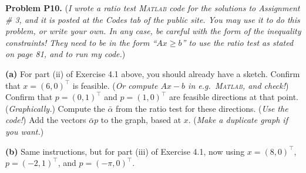 \documentclass[12pt]{amsart}
\newcommand{\Matlab}{\textsc{Matlab}\xspace}
\newcommand{\prob}[1]{\bigskip\noindent\textbf{#1}\quad }
\newcommand{\epart}[1]{\medskip\noindent\textbf{(#1)}\quad }
\begin{document}
\prob{Problem P10.}  (\emph{I wrote a ratio test \Matlab code for the solutions to Assignment \# 3, and it is posted at the Codes tab of the public site.  You may use it to do this problem, or write your own.  In any case, be careful with the form of the inequality constraints!  They need to be in the form ``$Ax\ge b$'' to use the ratio test as stated on page 81, and to run my code.})

\epart{a}  For part (ii) of Exercise 4.1 above, you should already have a sketch.  Confirm that $x=(6,0)^\top$ is feasible.  (\emph{Or compute $Ax-b$ in e.g.~\Matlab, and check!}) Confirm that $p=(0,1)^\top$ and $p=(1,0)^\top$ are feasible directions at that point.  (\emph{Graphically.})  Compute the $\bar \alpha$ from the ratio test for these directions.  (\emph{Use the code!})  Add the vectors $\bar \alpha p$ to the graph, based at $x$.  (\emph{Make a duplicate graph if you want.})

\epart{b}  Same instructions, but for part (iii) of Exercise 4.1, now using $x=(8,0)^\top$, $p=(-2,1)^\top$, and $p=(-\pi,0)^\top$.
\end{document}
